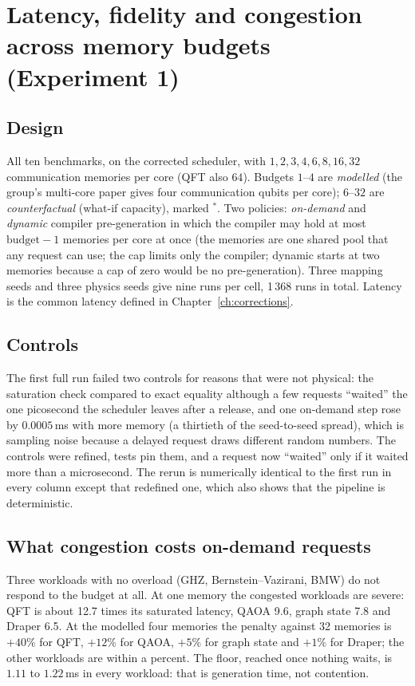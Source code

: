 \chapter{Latency, fidelity and congestion across memory budgets (Experiment 1)}
\label{ch:exp1}

\section{Design}
All ten benchmarks, on the corrected scheduler, with $1,2,3,4,6,8,16,32$ communication memories per core (QFT also $64$). Budgets $1$--$4$ are \emph{modelled}
(the group's multi-core paper gives four communication qubits per core); $6$--$32$ are \emph{counterfactual} (what-if capacity), marked $^*$. Two policies:
\emph{on-demand} and \emph{dynamic} compiler pre-generation in which the compiler may hold at most $\text{budget}-1$ memories per core at once (the memories are one shared pool that any request can use; the cap limits only the compiler; dynamic starts at two memories because a cap of zero would be no pre-generation).
Three mapping seeds and three physics seeds give nine runs per cell, 1\,368 runs in total. Latency is the common latency defined in Chapter~\ref{ch:corrections}.

\section{Controls}

The first full run failed two controls for reasons that were not physical: the saturation check compared to exact equality although a few requests ``waited''
the one picosecond the scheduler leaves after a release, and one on-demand step rose by $0.0005$\,ms with more memory (a thirtieth of the seed-to-seed spread), which is sampling
noise because a delayed request draws different random numbers. The controls were refined, tests pin them, and a request now ``waited'' only if it waited more than a microsecond.
The rerun is numerically identical to the first run in every column except that redefined one, which also shows that the pipeline is deterministic.

\section{What congestion costs on-demand requests}


Three workloads with no overload (GHZ, Bernstein--Vazirani, BMW) do not respond to the budget at all. At one memory the congested workloads are severe: QFT is about 12.7 times
its saturated latency, QAOA 9.6, graph state 7.8 and Draper 6.5. At the modelled four memories the penalty against 32 memories is $+40\%$ for QFT, $+12\%$ for QAOA, $+5\%$ for graph state and
$+1\%$ for Draper; the other workloads are within a percent. The floor, reached once nothing waits, is $1.11$ to $1.22$\,ms in every workload: that is generation time, not contention.

